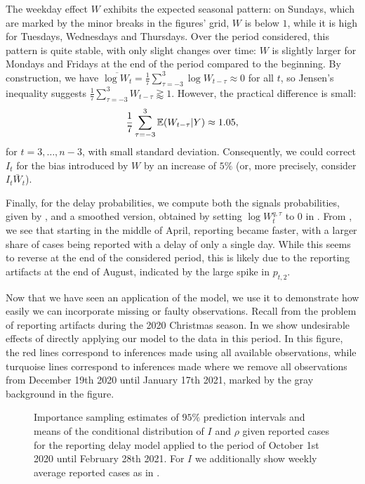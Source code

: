 The weekday effect $W$ exhibits the expected seasonal pattern: on Sundays, which are marked by the minor breaks in the figures' grid, $W$ is below $1$, while it is high for Tuesdays, Wednesdays and Thursdays. Over the period considered, this pattern is quite stable, with only slight changes over time: $W$ is slightly larger for Mondays and Fridays at the end of the period compared to the beginning. By construction, we have $\overline{\log W_{t}} = \frac{1}{7}\sum_{\tau = -3}^3 \log W_{t - \tau} \approx 0$ for all $t$, so Jensen's inequality suggests $\frac{1}{7} \sum_{\tau = -3}^3 W_{t - \tau} \gtrapprox 1$. However, the practical difference is small: $$ \frac{1}{7} \sum_{\tau = -3}^3 \mathbb E (W_{t - \tau} | Y) \approx 1.05,$$ for $t = 3, \dots, n-3$, with small standard deviation. Consequently, we could correct $I_{t}$ for the bias introduced by $W$ by an increase of $5\%$ (or, more precisely, consider $ I_{t} \bar W_{t} $). 

Finally, for the delay probabilities, we compute both the signals probabilities, given by , and a smoothed version, obtained by setting $\log W_{t}^{q,\tau}$ to $0$ in . From , we see that starting in the middle of April, reporting became faster, with a larger share of cases being reported with a delay of only a single day. While this seems to reverse at the end of the considered period, this is likely due to the reporting artifacts at the end of August, indicated by the large spike in $p_{t,2}$. 

Now that we have seen an application of the model, we use it to demonstrate how easily we can incorporate missing or faulty observations. Recall from  the problem of reporting artifacts during the 2020 Christmas season. In  we show undesirable effects of directly applying our model to the data in this period. In this figure, the red lines correspond to inferences made using all available observations, while turquoise lines correspond to inferences made where we remove all observations from December 19th 2020 until January 17th 2021, marked by the gray background in the figure. 
\begin{figure}
    \resizebox{\textwidth}{!}{%
    }
    \caption{Importance sampling estimates of $95\%$ prediction intervals and means of the conditional distribution of $I$ and $\rho$ given reported cases for the reporting delay model applied to the period of October 1st 2020 until February 28th 2021. For $I$ we additionally show weekly average reported cases as in . }
    \label{fig:christmas_prediction_intervals_I_rho}
\end{figure}

